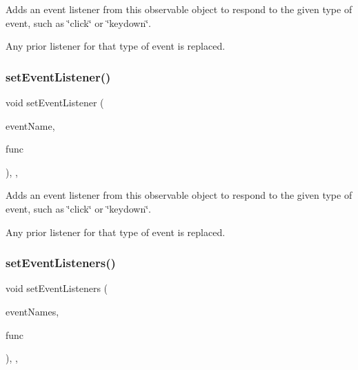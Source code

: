 Adds an event listener from this observable object to respond to the given type of event, such as \char`\"{}click\char`\"{} or \char`\"{}keydown\char`\"{}. 

Any prior listener for that type of event is replaced. \mbox{\label{classsgl_1_1GObservable_abac4cb9f9e626e010e87f5d91573c8a5}} 
\subsubsection{\texorpdfstring{set\+Event\+Listener()}{setEventListener()}\hspace{0.1cm}{\footnotesize\ttfamily [2/2]}}
{\footnotesize\ttfamily void set\+Event\+Listener (\begin{DoxyParamCaption}\item[{const std\+::string \&}]{event\+Name,  }\item[{\mbox{\hyperlink{namespacesgl_a54427ce97bb1c2804e4fe2b0a62e8b17}{G\+Event\+Listener\+Void}}}]{func }\end{DoxyParamCaption})\hspace{0.3cm}{\ttfamily [protected]}, {\ttfamily [virtual]}, {\ttfamily [inherited]}}



Adds an event listener from this observable object to respond to the given type of event, such as \char`\"{}click\char`\"{} or \char`\"{}keydown\char`\"{}. 

Any prior listener for that type of event is replaced. \mbox{\label{classsgl_1_1GObservable_afa388d69c33c718cf035774604065604}} 
\subsubsection{\texorpdfstring{set\+Event\+Listeners()}{setEventListeners()}\hspace{0.1cm}{\footnotesize\ttfamily [1/2]}}
{\footnotesize\ttfamily void set\+Event\+Listeners (\begin{DoxyParamCaption}\item[{std\+::initializer\+\_\+list$<$ std\+::string $>$}]{event\+Names,  }\item[{\mbox{\hyperlink{namespacesgl_ae9f3e9eab70035da1a2b114e21357b25}{G\+Event\+Listener}}}]{func }\end{DoxyParamCaption})\hspace{0.3cm}{\ttfamily [protected]}, {\ttfamily [virtual]}, {\ttfamily [inherited]}}



